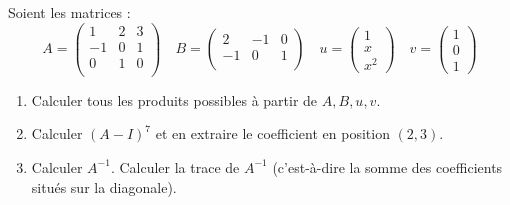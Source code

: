 \begin{frame}
\begin{tp}
Soient les matrices :
$$A = 
\begin{pmatrix}
1&2&3\\
-1&0&1\\
0&1&0\\ 
\end{pmatrix}
\quad
B = 
\begin{pmatrix}
2&-1&0\\
-1&0&1\\ 
\end{pmatrix}
\quad
u = \begin{pmatrix}1\\x\\x^2\end{pmatrix}
\quad
v = \begin{pmatrix}1\\0\\1\end{pmatrix}$$

\begin{enumerate}
  \item Calculer tous les produits possibles 
  à partir de $A,B,u,v$.
  
  \item Calculer $(A-I)^7$ et en extraire le coefficient 
  en position $(2,3)$.
  
  \item Calculer $A^{-1}$. Calculer la trace de $A^{-1}$
  (c'est-à-dire la somme des coefficients situés sur la diagonale).
\end{enumerate}
  
\end{tp}
\end{frame}




